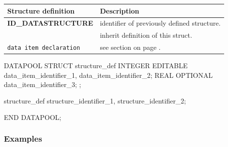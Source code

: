 

\begin{tabularx}{\textwidth}{l|X}
Structure definition            & Description \\
\hline
{\bfseries ID\_DATASTRUCTURE}   & identifier of previously defined structure. \\
                                & inherit definition of this struct. \\
\verb+data item declaration+ & see section \nameref{sec:dpitem} on page \pageref{sec:dpitem}. \\
\end{tabularx}
\vspace{0.5cm}



\begin{boxedminipage}[t]{\linewidth}
\begin{intens}
DATAPOOL
  STRUCT structure_def
  {
     INTEGER {EDITABLE}
        data_item_identifier_1,
        data_item_identifier_2;
     REAL {OPTIONAL}
        data_item_identifier_3;
  };

  structure_def
    structure_identifier_1,
    structure_identifier_2;

END DATAPOOL;
\end{intens}
\end{boxedminipage}


\newpage
\subsubsection{Examples}
\label{sec:dpexamples}


